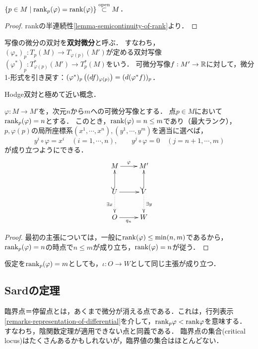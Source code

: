 \documentclass[uplatex,dvipdfmx]{jsreport}
\begin{document}
\begin{lemma}[最大ランク集合は開集合である]
    $\left\{p\in M\mid \mathrm{rank}_p(\varphi)=\mathrm{rank}(\varphi)\right\}\overset{\mathrm{open}}{\subset} M$．
\end{lemma}
\begin{proof}
    rankの半連続性\ref{lemma-semicontinuity-of-rank}より．
\end{proof}

\begin{definition}
    写像の微分の双対を\textbf{双対微分}と呼ぶ．
    すなわち，$(\varphi_*)_p:T_p(M)\to T_{\varphi(p)}(M')$が定める双対写像$(\varphi^*)_p:T_{\varphi(p)}^*(M')\to T_{p}^*(M)$をいう．
    可微分写像$f:M'\to\mathbb{R}$に対して，微分1-形式を引き戻す：$(\varphi^*)_p\left((df)_{\varphi(p)}\right)=(d(\varphi^*f))_p$．
\end{definition}
\begin{remark}
    Hodge双対と極めて近い概念．
\end{remark}

\begin{theorem}[可微分多様体に一般化された陰関数定理]\label{thm-implicit-function-thm}
    $\varphi:M\to M'$を，次元$n$から$m$への可微分写像とする．
    点$p\in M$において$\mathrm{rank}_p(\varphi)=n$とする．
    このとき，$\mathrm{rank}(\varphi)=n\le m$であり（最大ランク），$p,\varphi(p)$の局所座標系$(x^1,\cdots,x^n),(y^1,\cdots,y^m)$を適当に選べば，
    \[y^i\circ\varphi=x^i\quad(i=1,\cdots,n),\qquad y^j\circ\varphi=0\quad(j=n+1,\cdots,m)\]
    が成り立つようにできる．
    \[\xymatrix{
        M\ar[r]^-\varphi&M'\\
        U\ar@{^{(}->}[u]\ar[r]\ar@{.>}[d]_-{\exists x}&V\ar@{^{(}->}[u]\ar@{.>}[d]^-{\exists y}\\
        O\ar[r]_-{q_n}&W
    }\]
\end{theorem}
\begin{proof}
    最初の主張については，一般に$\mathrm{rank}(\varphi)\le\min(n,m)$であるから，$\mathrm{rank}_p(\varphi)=n$の時点で$n\le m$が成り立ち，$\mathrm{rank}(\varphi)=n$が従う．
\end{proof}
\begin{remark}
    仮定を$\mathrm{rank}_p(\varphi)=m$としても，$\iota:O\to W$として同じ主張が成り立つ．
\end{remark}

\subsection{Sardの定理}

\begin{tcolorbox}[colframe=ForestGreen, colback=ForestGreen!10!white,breakable,colbacktitle=ForestGreen!40!white,coltitle=black,fonttitle=\bfseries\sffamily,
title=]
    臨界点＝停留点とは，あくまで微分が消える点である．これは，行列表示\ref{remarks-representation-of-differential}を介して，$\mathrm{rank}_p\varphi<\mathrm{rank}\varphi$を意味する．
    すなわち，陰関数定理が適用できない点と同義である．
    臨界点の集合(critical locus)はたくさんあるかもしれないが，臨界値の集合はほとんどない．
\end{tcolorbox}
\end{document}
